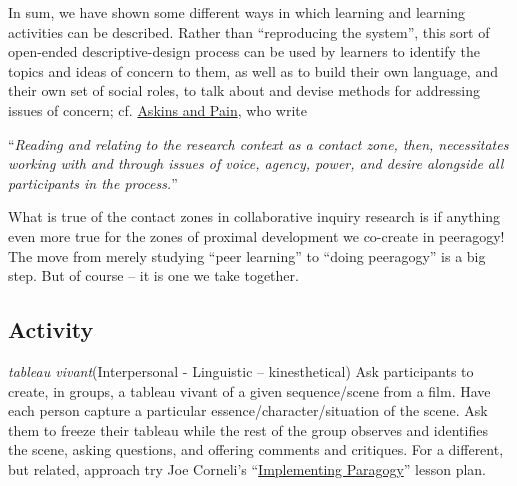 In sum, we have shown some different ways in which learning and learning
activities can be described. Rather than ``reproducing the system'',
this sort of open-ended descriptive-design process can be used by
learners to identify the topics and ideas of concern to them, as well as
to build their own language, and their own set of social roles, to talk
about and devise methods for addressing issues of concern; cf.
\href{http://scholar.google.com/scholar?cluster=7641713096478524562\&hl=en\&as\_sdt=0,14}{Askins
and Pain}, who write

``\emph{Reading and relating to the research context as a contact zone,
then, necessitates working with and through issues of voice, agency,
power, and desire alongside all participants in the process.}''

What is true of the contact zones in collaborative inquiry research is
if anything even more true for the zones of proximal development we
co-create in peeragogy! The move from merely studying ``peer learning''
to ``doing peeragogy'' is a big step. But of course -- it is one we take
together.

\subsection{Activity}

\emph{tableau vivant}(Interpersonal - Linguistic -- kinesthetical) Ask
participants to create, in groups, a tableau vivant of a given
sequence/scene from a film. Have each person capture a particular
essence/character/situation of the scene. Ask them to freeze their
tableau while the rest of the group observes and identifies the scene,
asking questions, and offering comments and critiques. For a different,
but related, approach try Joe Corneli's
``\href{http://en.wikiversity.org/wiki/User:Arided/ImplementingParagogy}{Implementing
Paragogy}'' lesson plan.
